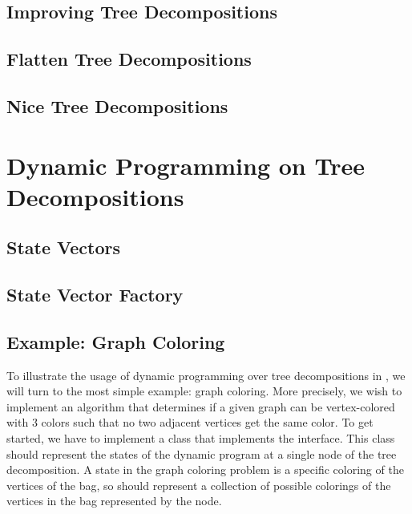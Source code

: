 \documentclass[a4paper, ukenglish, twoside, openright]{jdrasilmanual}
\begin{document}
\section{Improving Tree Decompositions}
\section{Flatten Tree Decompositions}
\section{Nice Tree Decompositions}

\chapter{Dynamic Programming on Tree Decompositions}
\section{State Vectors}
\section{State Vector Factory}

\section{Example: Graph Coloring}
To illustrate the usage of dynamic programming over tree
decompositions in \Jdrasil{}, we will turn to the most simple example:
graph coloring. More precisely, we wish to implement an algorithm that
determines if a given graph can be vertex-colored with $3$ colors such
that no two adjacent vertices get the same color. To get started, we
have to implement a class that implements the 
interface. This class should represent the states of the dynamic
program at a single node of the tree decomposition. A state in the
graph coloring problem is a specific coloring of the vertices of the
bag, so  should represent a collection of
possible colorings of the vertices in the bag represented by the node.
\end{document}
